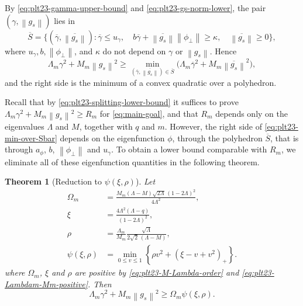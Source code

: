 ﻿\documentclass[11pt]{article}
\newtheorem{theorem}{Theorem}[section]
\numberwithin{equation}{section}
\newcommand{\norm}[1]{\left\lVert #1\right\rVert}
\newcommand{\pos}[1]{\left(#1\right)_{+}}
\begin{document}
By \eqref{eq:plt23-gamma-upper-bound} and \eqref{eq:plt23-gs-norm-lower}, the pair $(\gamma,\norm{g_s})$ lies in
\begin{equation}\label{eq:plt23-Sbar}
  \overline S=\bigl\{(\overline\gamma,\overline{\norm{g_s}}):
  \overline\gamma\le u_\gamma,\quad
  b\overline\gamma+\overline{\norm{g_s}}\norm{\phi_\perp}\ge\kappa,\quad
  \overline{\norm{g_s}}\ge0\bigr\},
\end{equation}
where $u_\gamma, b, \norm{\phi_\perp}$, and $\kappa$ do not depend on $\gamma$ or $\norm{g_s}$.
Hence
\begin{equation}\label{eq:plt23-min-over-Sbar}
  \Lambda_m\gamma^2+M_m\norm{g_s}^2
  \ge\min_{(\overline\gamma,\overline{\norm{g_s}})\in\overline S}
  \bigl(\Lambda_m\overline\gamma^2+M_m\overline{\norm{g_s}}^2\bigr),
\end{equation}
and the right side is the minimum of a convex quadratic over a polyhedron.

Recall that by \eqref{eq:plt23-splitting-lower-bound} it suffices to prove $\Lambda_m\gamma^2+M_m\norm{g_s}^2\ge R_m$ for \eqref{eq:main-goal}, and that $R_m$ depends only on the eigenvalues $\Lambda$ and $M$, together with $q$ and $m$.
However, the right side of \eqref{eq:plt23-min-over-Sbar} depends on the eigenfunction $\phi$, through the polyhedron $\overline S$, that is through $a_\phi$, $b$, $\norm{\phi_\perp}$ and $u_\gamma$.
To obtain a lower bound comparable with $R_m$, we eliminate all of these eigenfunction quantities in the following theorem.

\begin{theorem}[Reduction to $\psi(\xi,\rho)$]\label{thm:plt23-huber-elim}
  Let
  \begin{align}
    \Omega_m&=\frac{M_m(\Lambda-M)\sqrt{2\Lambda}\,(1-2\Lambda)^2}{4\Lambda^2},
    \label{eq:plt23-C-xi-rho}\\
    \xi&=\frac{4\Lambda^2(\Lambda-q)}{(1-2\Lambda)^2},
    \label{eq:plt23-xi-def}\\
    \rho&=\frac{\Lambda_m}{M_m}\frac{\sqrt\Lambda}{2\sqrt2\,(\Lambda-M)},
    \label{eq:plt23-rho-def}\\
    \psi(\xi,\rho)&=
    \min_{0\le v\le1}
    \left\{\rho v^2+\pos{\xi-v+v^2}\right\}.
    \label{eq:plt23-psi-def}
  \end{align}
  where $\Omega_m$, $\xi$ and $\rho$ are positive by \eqref{eq:plt23-M-Lambda-order} and \eqref{eq:plt23-Lambdam-Mm-positive}.
  Then
  \begin{equation}\label{eq:plt23-huber-payment}
    \Lambda_m\gamma^2+M_m\norm{g_s}^2
    \ge \Omega_m\psi(\xi,\rho).
  \end{equation}
\end{theorem}
\end{document}
